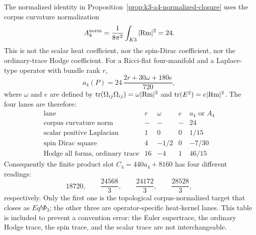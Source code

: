 
\makeatletter
{}
\makeatother
\providecommand{\PSp}{\mathrm{PSp}}
\providecommand{\Aut}{\mathrm{Aut}}
\providecommand{\spec}{\operatorname{spec}}


\begin{remark}
\label{rem:k3-a4-convention-table}
The normalized identity in Proposition~\ref{prop:k3-a4-normalized-closure} uses
the corpus curvature normalization
\[
  A_4^{\rm norm}=\frac{1}{8\pi^2}\int_{K3}|{\rm Rm}|^2=24.
\]
This is not the scalar heat coefficient, nor the spin-Dirac coefficient, nor
the ordinary-trace Hodge coefficient.  For a Ricci-flat four-manifold and a
Laplace-type operator with bundle rank $r$,
\[
  a_4(P)=24\,\frac{2r+30\omega+180e}{720},
\]
where $\omega$ and $e$ are defined by
$\operatorname{tr}(\Omega_{ij}\Omega_{ij})=\omega |{\rm Rm}|^2$ and
$\operatorname{tr}(E^2)=e |{\rm Rm}|^2$.  The four lanes are therefore:
\[
\begin{array}{c|c|c|c|c}
\text{lane} & r & \omega & e & a_4\text{ or }A_4 \\
\hline
\text{corpus curvature norm} & - & - & - & 24 \\
\text{scalar positive Laplacian} & 1 & 0 & 0 & 1/15 \\
\text{spin Dirac square} & 4 & -1/2 & 0 & -7/30 \\
\text{Hodge all forms, ordinary trace} & 16 & -4 & 1 & 46/15
\end{array}
\]
Consequently the finite product slot $C_4=440a_4+8160$ has four different
readings:
\[
  18720,\qquad \frac{24568}{3},\qquad \frac{24172}{3},\qquad
  \frac{28528}{3},
\]
respectively.  Only the first one is the topological corpus-normalized target
that closes as $E q!\Phi_3$; the other three are operator-specific heat-kernel
lanes.  This table is included to prevent a convention error: the Euler
supertrace, the ordinary Hodge trace, the spin trace, and the scalar trace are
not interchangeable.
\end{remark}

